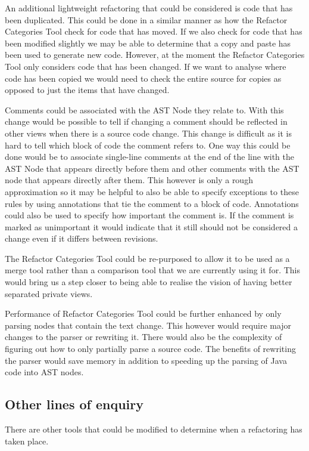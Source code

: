 An additional lightweight refactoring that could be considered is code that has been duplicated.
This could be done in a similar manner as how the Refactor Categories Tool check for code that has moved.
If we also check for code that has been modified slightly we may be able to determine that a copy and paste has been used to generate new code.
However, at the moment the Refactor Categories Tool only considers code that has been changed.
If we want to analyse where code has been copied we would need to check the entire source for copies as opposed to just the items that have changed.

Comments could be associated with the AST Node they relate to.  
With this change would be possible to tell if changing a comment should be reflected in other views when there is a source code change. 
This change is difficult as it is hard to tell which block of code the comment refers to.  
One way this could be done would be to associate single-line comments at the end of the line with the AST Node that appears directly before them and other comments with the AST node that appears directly after them.  
This however is only a rough approximation so it may be helpful to also be able to specify exceptions to these rules by using annotations that tie the comment to a block of code. Annotations could also be used to specify how important the comment is.
If the comment is marked as unimportant it would indicate that it still should not be considered a change even if it differs between revisions.

The Refactor Categories Tool could be re-purposed to allow it to be used as a merge tool rather than a comparison tool that we are currently using it for.  
This would bring us a step closer to being able to realise the vision of having better separated private views.  

Performance of Refactor Categories Tool could be further enhanced by only parsing nodes that contain the text change.
This however would require major changes to the parser or rewriting it. There would also be the complexity of figuring out how to only partially parse a source code.
The benefits of rewriting the parser would save memory in addition to speeding up the parsing of Java code into AST nodes.


\subsection{Other lines of enquiry}

There are other tools that could be modified to determine when a refactoring has taken place.

